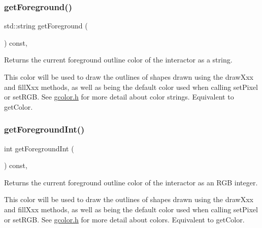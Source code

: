 \mbox{\label{classsgl_1_1GDrawingSurface_a4fa2d8b0192a3a5b4af4bbfe71194d03}} 
\subsubsection{\texorpdfstring{get\+Foreground()}{getForeground()}}
{\footnotesize\ttfamily std\+::string get\+Foreground (\begin{DoxyParamCaption}{ }\end{DoxyParamCaption}) const\hspace{0.3cm}{\ttfamily [virtual]}, {\ttfamily [inherited]}}



Returns the current foreground outline color of the interactor as a string. 

This color will be used to draw the outlines of shapes drawn using the draw\+Xxx and fill\+Xxx methods, as well as being the default color used when calling set\+Pixel or set\+R\+GB. See \mbox{\hyperlink{gcolor_8h_source}{gcolor.\+h}} for more detail about color strings. Equivalent to get\+Color. \mbox{\label{classsgl_1_1GDrawingSurface_ac3b12ab385a6ef9ae90fc879860ba726}} 
\subsubsection{\texorpdfstring{get\+Foreground\+Int()}{getForegroundInt()}}
{\footnotesize\ttfamily int get\+Foreground\+Int (\begin{DoxyParamCaption}{ }\end{DoxyParamCaption}) const\hspace{0.3cm}{\ttfamily [virtual]}, {\ttfamily [inherited]}}



Returns the current foreground outline color of the interactor as an R\+GB integer. 

This color will be used to draw the outlines of shapes drawn using the draw\+Xxx and fill\+Xxx methods, as well as being the default color used when calling set\+Pixel or set\+R\+GB. See \mbox{\hyperlink{gcolor_8h_source}{gcolor.\+h}} for more detail about colors. Equivalent to get\+Color. \mbox{\label{classsgl_1_1GWindow_adf27adaeeb8b551424b2096a20285fde}} 
